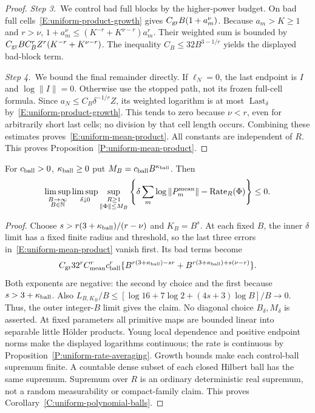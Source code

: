 \begin{proof}
  \medskip
  \noindent\textit{Step 3.~}We control bad full blocks by the higher-power
  budget.
  On bad full cells~\eqref{E:uniform-product-growth} gives $C_{\rm
  gr}B(1+a_m^\nu)$. Because $a_m > K \ge 1$ and $r > \nu$, $1+a_m^\nu \le
  (K^{-r}+K^{\nu-r})a_m^r$. Their weighted sum is bounded by $C_{\rm
  gr}BC_B^rZ^r(K^{-r}+K^{\nu-r})$. The inequality $C_B \le 32B^{3-1/r}$ yields
  the displayed bad-block term.


  \medskip
  \noindent\textit{Step 4.~}We bound the final remainder directly.
  If $\ell_N = 0$, the last endpoint is $I$ and $\log\|I\| = 0$. Otherwise use
  the stopped path, not its frozen full-cell formula. Since $a_N \le
  C_B\delta^{-1/r}Z$, its weighted logarithm is at most
  $\operatorname{Last}_\delta$ by~\eqref{E:uniform-product-growth}. This tends
  to zero because $\nu < r$, even for arbitrarily short last cells; no division
  by that cell length occurs. Combining these estimates
  proves~\eqref{E:uniform-mean-product}. All constants are independent of $R$.
  This proves Proposition~\ref{P:uniform-mean-product}.
\end{proof}

\begin{corollary}\label{C:uniform-polynomial-balls}
  For $c_{\rm ball} > 0$, $\kappa_{\rm ball} \ge 0$ put $M_B = c_{\rm
  ball}B^{\kappa_{\rm ball}}$. Then
  \[
    \limsup_{\substack{B\to\infty\\B\in\mathbb{N}}}
    \limsup_{\delta\downarrow0}
    \sup_{\substack{R\ge1\\\|\Phi\|\le M_B}}
    \left\{\delta\sum_m\log\|P_m^{\rm mean}\|
    -\operatorname{Rate}_R(\Phi)\right\}\le0 .
  \]
\end{corollary}

\begin{proof}
  Choose $s > r(3+\kappa_{\rm ball})/(r-\nu)$ and $K_B = B^s$. At each fixed
  $B$, the inner $\delta$ limit has a fixed finite radius and threshold, so the
  last three errors in~\eqref{E:uniform-mean-product} vanish first. Its bad
  terms become
  \[
    C_{\rm gr}32^r C_{\rm mean}^r c_{\rm ball}^r
    \{B^{r(3+\kappa_{\rm ball})-sr}
    +B^{r(3+\kappa_{\rm ball})+s(\nu-r)}\}.
  \]
  Both exponents are negative: the second by choice and the first because $s >
  3+\kappa_{\rm ball}$. Also $L_{B,K_B}/B \le [\log16+7\log2+(4s+3)\log B]/B \to
  0$. Thus, the outer integer-$B$ limit gives the claim. No diagonal choice
  $B_\delta,M_\delta$ is asserted. At fixed parameters all primitive maps are
  bounded linear into separable little H\"older products. Young local dependence
  and positive endpoint norms make the displayed logarithms continuous; the rate
  is continuous by Proposition~\ref{P:uniform-rate-averaging}. Growth bounds
  make each control-ball supremum finite. A countable dense subset of each
  closed Hilbert ball has the same supremum. Supremum over $R$ is an ordinary
  deterministic real supremum, not a random measurability or compact-family
  claim. This proves Corollary~\ref{C:uniform-polynomial-balls}.
\end{proof}

